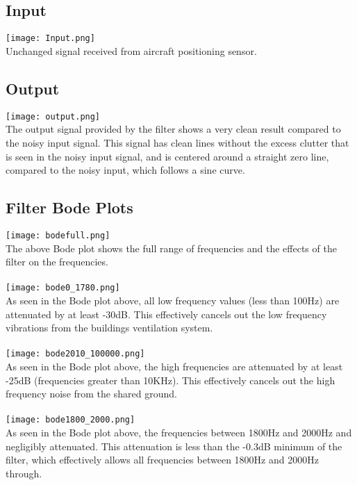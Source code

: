 \documentclass[12pt]{report}
\begin{document}
\subsection{Input}
    \texttt{[image: Input.png]}
    \\Unchanged signal received from aircraft positioning sensor.

\subsection{Output}
    \texttt{[image: output.png]}
    \\The output signal provided by the filter shows a very clean result compared to the noisy input signal. This signal has clean lines without the excess clutter that is seen in the noisy input signal, and is centered around a straight zero line, compared to the noisy input, which follows a sine curve.

\subsection{Filter Bode Plots}
    \texttt{[image: bodefull.png]}
    \\The above Bode plot shows the full range of frequencies and the effects of the filter on the frequencies.
    \\ \\
    \texttt{[image: bode0\_1780.png]}
    \\As seen in the Bode plot above, all low frequency values (less than 100Hz) are attenuated by at least -30dB. This effectively cancels out the low frequency vibrations from the buildings ventilation system.
    \\ \\
    \texttt{[image: bode2010\_100000.png]}
    \\As seen in the Bode plot above, the high frequencies are attenuated by at least -25dB (frequencies greater than 10KHz). This effectively cancels out the high frequency noise from the shared ground.
    \\ \\
    \texttt{[image: bode1800\_2000.png]}
    \\As seen in the Bode plot above, the frequencies between 1800Hz and 2000Hz and negligibly attenuated. This attenuation is less than the -0.3dB minimum of the filter, which effectively allows all frequencies between 1800Hz and 2000Hz through.
\end{document}
